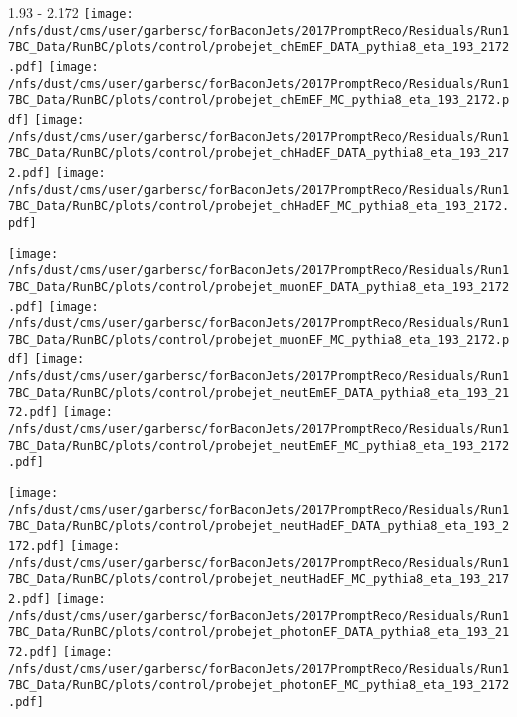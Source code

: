 \documentclass[t,compress]{beamer}
\begin{document}
\begin{frame}{1.93 - 2.172}
	\texttt{[image: /nfs/dust/cms/user/garbersc/forBaconJets/2017PromptReco/Residuals/Run17BC\_Data/RunBC/plots/control/probejet\_chEmEF\_DATA\_pythia8\_eta\_193\_2172.pdf]}
	\texttt{[image: /nfs/dust/cms/user/garbersc/forBaconJets/2017PromptReco/Residuals/Run17BC\_Data/RunBC/plots/control/probejet\_chEmEF\_MC\_pythia8\_eta\_193\_2172.pdf]}
	\texttt{[image: /nfs/dust/cms/user/garbersc/forBaconJets/2017PromptReco/Residuals/Run17BC\_Data/RunBC/plots/control/probejet\_chHadEF\_DATA\_pythia8\_eta\_193\_2172.pdf]}
	\texttt{[image: /nfs/dust/cms/user/garbersc/forBaconJets/2017PromptReco/Residuals/Run17BC\_Data/RunBC/plots/control/probejet\_chHadEF\_MC\_pythia8\_eta\_193\_2172.pdf]}
\newline

\vspace{-0.65cm}
	\texttt{[image: /nfs/dust/cms/user/garbersc/forBaconJets/2017PromptReco/Residuals/Run17BC\_Data/RunBC/plots/control/probejet\_muonEF\_DATA\_pythia8\_eta\_193\_2172.pdf]}
	\texttt{[image: /nfs/dust/cms/user/garbersc/forBaconJets/2017PromptReco/Residuals/Run17BC\_Data/RunBC/plots/control/probejet\_muonEF\_MC\_pythia8\_eta\_193\_2172.pdf]}
	\texttt{[image: /nfs/dust/cms/user/garbersc/forBaconJets/2017PromptReco/Residuals/Run17BC\_Data/RunBC/plots/control/probejet\_neutEmEF\_DATA\_pythia8\_eta\_193\_2172.pdf]}
	\texttt{[image: /nfs/dust/cms/user/garbersc/forBaconJets/2017PromptReco/Residuals/Run17BC\_Data/RunBC/plots/control/probejet\_neutEmEF\_MC\_pythia8\_eta\_193\_2172.pdf]}
\newline

\vspace{-0.65cm}
	\texttt{[image: /nfs/dust/cms/user/garbersc/forBaconJets/2017PromptReco/Residuals/Run17BC\_Data/RunBC/plots/control/probejet\_neutHadEF\_DATA\_pythia8\_eta\_193\_2172.pdf]}
	\texttt{[image: /nfs/dust/cms/user/garbersc/forBaconJets/2017PromptReco/Residuals/Run17BC\_Data/RunBC/plots/control/probejet\_neutHadEF\_MC\_pythia8\_eta\_193\_2172.pdf]}
	\texttt{[image: /nfs/dust/cms/user/garbersc/forBaconJets/2017PromptReco/Residuals/Run17BC\_Data/RunBC/plots/control/probejet\_photonEF\_DATA\_pythia8\_eta\_193\_2172.pdf]}
	\texttt{[image: /nfs/dust/cms/user/garbersc/forBaconJets/2017PromptReco/Residuals/Run17BC\_Data/RunBC/plots/control/probejet\_photonEF\_MC\_pythia8\_eta\_193\_2172.pdf]}
\end{frame}
\end{document}
